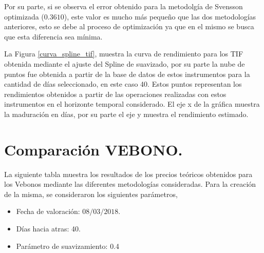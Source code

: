 \hspace{0.4cm} Por su parte, si se observa el error obtenido para la metodolg\'ia de Svensson optimizada ($0.3610$), este valor es mucho m\'as peque\~no que las dos metodolog\'ias anteriores, esto se debe al proceso de optimizaci\'on ya que en el mismo se busca que esta diferencia sea m\'inima.

\hspace{0.4cm} La Figura \ref{curva_spline_tif}, muestra la curva de rendimiento para los TIF obtenida mediante el ajuste del Spline de suavizado, por su parte la nube de puntos fue obtenida a partir de la base de datos de estos instrumentos para la cantidad de d\'ias seleccionado, en este caso 40. Estos puntos representan los rendimientos obtenidos a partir de las operaciones realizadas con estos instrumentos en el horizonte temporal considerado. El eje x de la gr\'afica muestra la maduraci\'on en d\'ias, por su parte el eje y muestra el rendimiento estimado.

\newpage

\section{Comparaci\'on VEBONO.}


\hspace{0.4cm}La siguiente tabla muestra los resultados de los precios te\'oricos obtenidos para los Vebonos mediante las diferentes metodolog\'ias consideradas. Para la creaci\'on de la misma, se consideraron los siguientes par\'ametros,

\begin{itemize}
  \item Fecha de valoraci\'on: $08/03/2018$.
  \item D\'ias hacia atras: 40.
  \item Par\'ametro de suavizamiento: 0.4
\end{itemize}

